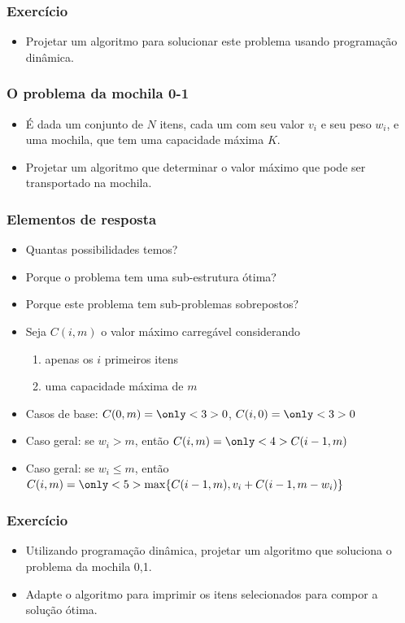 \documentclass{beamer}
\begin{document}
\begin{frame}
\frametitle{Exercício}

\begin{itemize}
\item Projetar um algoritmo para solucionar este problema usando
programação dinâmica.
\end{itemize}

\end{frame}

\begin{frame}
\frametitle{O problema da mochila 0-1}

\begin{itemize}
\item É dada um conjunto de $N$ itens, cada um com seu valor $v_i$ e seu peso
  $w_i$, e uma mochila, que tem uma capacidade máxima $K$.

\item Projetar um algoritmo que determinar o valor máximo que pode ser
  transportado na mochila.
\end{itemize}

\end{frame}

\begin{frame}
\frametitle{Elementos de resposta}

\begin{itemize}
\item Quantas possibilidades temos?

\item Porque o problema tem uma sub-estrutura ótima?

\item Porque este problema tem sub-problemas sobrepostos?

\pause
\item Seja $C(i, m)$ o valor máximo carregável considerando 
  \begin{enumerate}
    \item apenas os $i$ primeiros itens
    \item uma capacidade máxima de $m$
  \end{enumerate}

\item Casos de base: $C(0, m) = \only<3>{0}$, $C(i, 0) = \only<3>{0}$
\item Caso geral: se $w_i > m$, então $C(i, m) = \only<4>{C(i-1, m)}$
\item Caso geral: se $w_i \le m$, então $C(i, m) = \only<5>{
\max \{ C(i-1, m), v_i + C(i-1, m-w_i) \}}$

\end{itemize}

\end{frame}

\begin{frame}
\frametitle{Exercício}

\begin{itemize}

\item Utilizando programação dinâmica, projetar um algoritmo que soluciona o
  problema da mochila 0,1.

\item Adapte o algoritmo para imprimir os itens selecionados para compor a
  solução ótima.
\end{itemize}

\end{frame}
\end{document}
